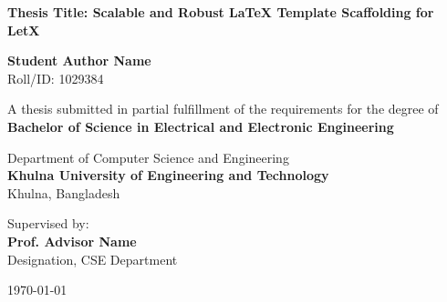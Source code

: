 \begin{titlepage}
\begin{center}
    \vspace*{1cm}
    
    
    \vspace{1.5cm}
    
    {\huge \bfseries \color{primary} Thesis Title: Scalable and Robust LaTeX Template Scaffolding for LetX}
    
    \vspace{1.5cm}
    
    {\Large \bfseries Student Author Name} \\
    \vspace{0.2cm}
    {Roll/ID: 1029384}
    
    \vspace{1.5cm}
    
    {A thesis submitted in partial fulfillment of the requirements for the degree of} \\
    \vspace{0.3cm}
    {\large \bfseries \color{secondary} Bachelor of Science in Electrical and Electronic Engineering}
    
    \vspace{1.5cm}
    
    {Department of Computer Science and Engineering} \\
    \vspace{0.2cm}
    {\large \bfseries \color{primary} Khulna University of Engineering and Technology} \\
    \vspace{0.1cm}
    {Khulna, Bangladesh}
    
    \vfill
    
    {Supervised by:} \\
    {\large \bfseries Prof. Advisor Name} \\
    {Designation, CSE Department}
    
    \vspace{1cm}
    
    {\large \today}
    
\end{center}
\end{titlepage}
